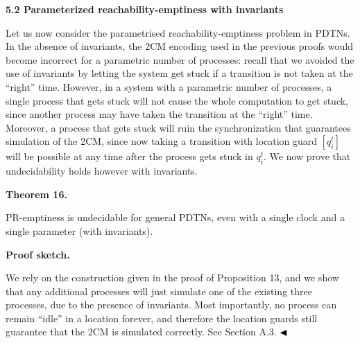 \documentclass[10pt,a4paper]{article}
\begin{document}
 
 
 
\par\medskip\noindent\textbf{5.2 Parameterized reachability-emptiness with invariants}\par
 
 
Let us now consider the parametrised reachability-emptiness problem in PDTNs. In the absence of invariants, the 2CM encoding used in the previous proofs would become incorrect for a parametric number of processes: recall that we avoided the use of invariants by letting the system get stuck if a transition is not taken at the “right” time. However, in a system with a parametric number of processes, a single process that gets stuck will not cause the whole computation to get stuck, since another process may have taken the transition at the “right” time. Moreover, a process that gets stuck will ruin the synchronization that guarantees simulation of the 2CM, since now taking a transition with location guard $[q_{i}^{t}]$ will be possible at any time after the process gets stuck in $q_{i}^{t}$. We now prove that undecidability holds however with invariants.\par
 
 
 
\par\medskip\noindent\textbf{Theorem 16.}\par
 
 
PR-emptiness is undecidable for general PDTNs, even with a single clock and a single parameter (with invariants).\par
 
 
 
 
\par\medskip\noindent\textbf{Proof sketch.}\par
 
 
We rely on the construction given in the proof of Proposition 13, and we show that any additional processes will just simulate one of the existing three processes, due to the presence of invariants. Most importantly, no process can remain “idle” in a location forever, and therefore the location guards still guarantee that the 2CM is simulated correctly. See Section A.3. $\hfill\blacktriangleleft$\par
 
\end{document}
